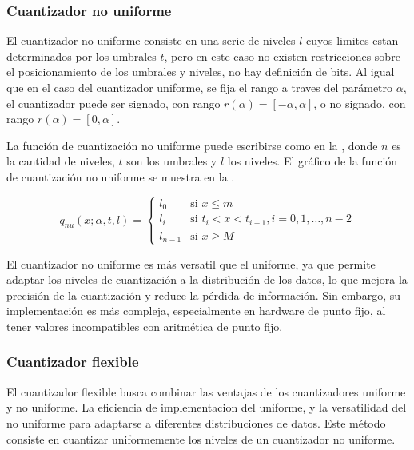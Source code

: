 \subsubsection{Cuantizador no uniforme}

El cuantizador no uniforme consiste en una serie de niveles $l$ cuyos limites estan determinados por los umbrales $t$, pero en este caso no existen restricciones sobre el posicionamiento de los umbrales y niveles, no hay definición de bits. Al igual que en el caso del cuantizador uniforme, se fija el rango a traves del parámetro $\alpha$, el cuantizador puede ser signado, con rango $r\left(\alpha\right) = [-\alpha, \alpha]$, o no signado, con rango $r\left(\alpha\right) = [0, \alpha]$.

La función de cuantización no uniforme puede escribirse como en la , donde $n$ es la cantidad de niveles, $t$ son los umbrales y $l$ los niveles. El gráfico de la función de cuantización no uniforme se muestra en la .

\begin{equation}
    \label{eq:non_uniform_quantizer}
    q_{nu}\left(x; \alpha, t, l\right) =
    \begin{cases}
        l_{0} & \text{si $x \leq m$} \\
        l_{i} & \text{si } t_i < x < t_{i+1}, i = 0, 1, \ldots, n-2 \\
        l_{n-1} & \text{si } x \geq M
    \end{cases}
\end{equation}


El cuantizador no uniforme es más versatil que el uniforme, ya que permite adaptar los niveles de cuantización a la distribución de los datos, lo que mejora la precisión de la cuantización y reduce la pérdida de información. Sin embargo, su implementación es más compleja, especialmente en hardware de punto fijo, al tener valores incompatibles con aritmética de punto fijo.


\subsubsection{Cuantizador flexible}
\label{sec:flex}

El cuantizador flexible busca combinar las ventajas de los cuantizadores uniforme y no uniforme. La eficiencia de implementacion del uniforme, y la versatilidad del no uniforme para adaptarse a diferentes distribuciones de datos. Este método consiste en cuantizar uniformemente los niveles de un cuantizador no uniforme.

